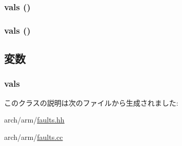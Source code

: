 \label{classArmISA_1_1ArmFaultVals_a7b40df863f325ba499b5fa5a34ad8f9d}
\hypertarget{classArmISA_1_1ArmFaultVals_a7b40df863f325ba499b5fa5a34ad8f9d}{
\subsubsection[{vals}]{ {\bf vals} ()}}
\label{classArmISA_1_1ArmFaultVals_a7b40df863f325ba499b5fa5a34ad8f9d}
\hypertarget{classArmISA_1_1ArmFaultVals_a7b40df863f325ba499b5fa5a34ad8f9d}{
\subsubsection[{vals}]{ {\bf vals} ()}}
\label{classArmISA_1_1ArmFaultVals_a7b40df863f325ba499b5fa5a34ad8f9d}


\subsection{変数}
\hypertarget{classArmISA_1_1ArmFaultVals_a8b3c2006cfd550d551232a82b397bbca}{
\subsubsection[{vals}]{ {\bf vals}}}
\label{classArmISA_1_1ArmFaultVals_a8b3c2006cfd550d551232a82b397bbca}


このクラスの説明は次のファイルから生成されました:\begin{DoxyCompactItemize}
\item 
arch/arm/\hyperlink{arch_2arm_2faults_8hh}{faults.hh}\item 
arch/arm/\hyperlink{arch_2arm_2faults_8cc}{faults.cc}\end{DoxyCompactItemize}
